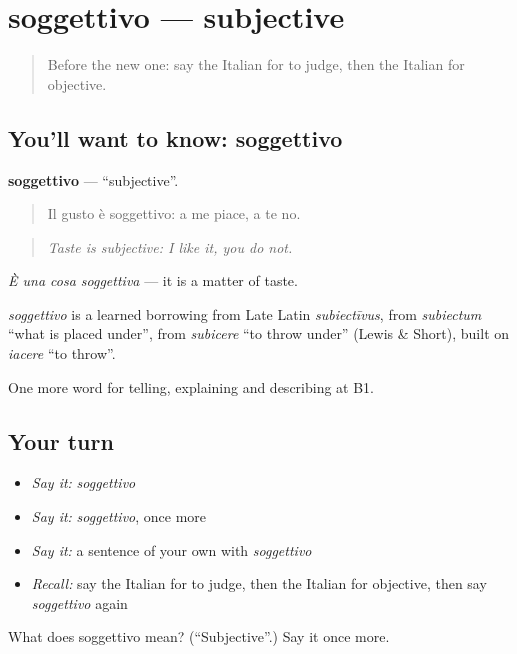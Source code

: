 \section[soggettivo]{soggettivo — subjective}

\label{lesson:IT-C347-soggettivo}



\begin{quote}
Before the new one: say the Italian for to judge, then the Italian for objective.
\end{quote}

\subsection*{You'll want to know: soggettivo}
\textbf{soggettivo} — \textquotedblleft{}subjective\textquotedblright{}.

\begin{quote}
Il gusto è soggettivo: a me piace, a te no.
\end{quote}

\begin{quote}
\emph{Taste is subjective: I like it, you do not.}
\end{quote}

\emph{È una cosa soggettiva} — it is a matter of taste.

\begin{cousinweb}
\emph{soggettivo} is a learned borrowing from Late Latin \emph{subiectīvus}, from \emph{subiectum} \textquotedblleft{}what is placed under\textquotedblright{}, from \emph{subicere} \textquotedblleft{}to throw under\textquotedblright{} (Lewis \& Short), built on \emph{iacere} \textquotedblleft{}to throw\textquotedblright{}.
\end{cousinweb}

\begin{grammarlens}[title={What you've built}]
One more word for telling, explaining and describing at B1.
\end{grammarlens}

\subsection*{Your turn}
\begin{itemize}
\raggedright
  \item \emph{Say it:} \emph{soggettivo}
  \item \emph{Say it:} \emph{soggettivo}, once more
  \item \emph{Say it:} a sentence of your own with \emph{soggettivo}
  \item \emph{Recall:} say the Italian for to judge, then the Italian for objective, then say \emph{soggettivo} again
\end{itemize}

\begin{tcolorbox}[breakable,colback=teal!4,colframe=teal!35!black,title={Before you move on}]
What does soggettivo mean? (\textquotedblleft{}Subjective\textquotedblright{}.) Say it once more.
\end{tcolorbox}
